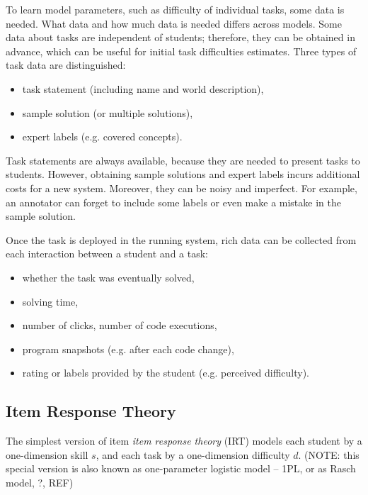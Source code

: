 To learn model parameters, such as difficulty of individual tasks, some data is needed.
What data and how much data is needed differs across models.
Some data about tasks are independent of students;
therefore, they can be obtained in advance,
which can be useful for initial task difficulties estimates.
Three types of task data are distinguished:

\begin{itemize}
  \item task statement (including name and world description),
  \item sample solution (or multiple solutions),
  \item expert labels (e.g. covered concepts).
\end{itemize}

Task statements are always available,
  because they are needed to present tasks to students.
However, obtaining sample solutions and expert labels
  incurs additional costs for a new system.
Moreover, they can be noisy and imperfect.
For example, an annotator can forget to include some labels
  or even make a mistake in the sample solution.

Once the task is deployed in the running system,
  rich data can be collected from each interaction between a student and a task:
\begin{itemize}
  \item whether the task was eventually solved,
  \item solving time,
  \item number of clicks, number of code executions,
  \item program snapshots (e.g. after each code change),
  \item rating or labels provided by the student (e.g. perceived difficulty).
\end{itemize}


\subsection{Item Response Theory}
\label{sec:irt}

The simplest version of item \emph{item response theory} (IRT)
  \cite{irt-visual-guide}
  models each student by a one-dimension skill $s$,
  and each task by a one-dimension difficulty $d$.
(NOTE: this special version is also known as one-parameter logistic model -- 1PL, or as Rasch model, ?, REF)

